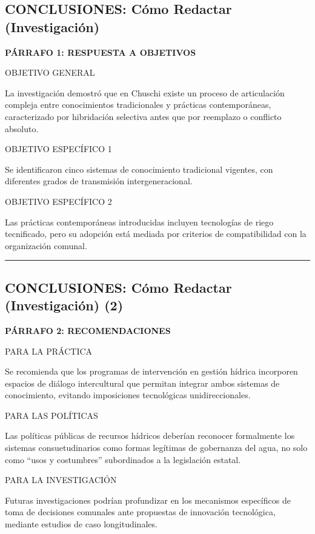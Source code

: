 \documentclass[
  11pt,
]{beaner}
\begin{document}
\subsection{CONCLUSIONES: Cómo Redactar
(Investigación)}\label{conclusiones-cuxf3mo-redactar-investigaciuxf3n}

\textbf{PÁRRAFO 1: RESPUESTA A OBJETIVOS}

{OBJETIVO GENERAL}

La investigación demostró que en Chuschi existe un proceso de
articulación compleja entre conocimientos tradicionales y prácticas
contemporáneas, caracterizado por hibridación selectiva antes que por
reemplazo o conflicto absoluto.

{OBJETIVO ESPECÍFICO 1}

Se identificaron cinco sistemas de conocimiento tradicional vigentes,
con diferentes grados de transmisión intergeneracional.

{OBJETIVO ESPECÍFICO 2}

Las prácticas contemporáneas introducidas incluyen tecnologías de riego
tecnificado, pero su adopción está mediada por criterios de
compatibilidad con la organización comunal.

\begin{center}\rule{0.5\linewidth}{0.5pt}\end{center}

\subsection{CONCLUSIONES: Cómo Redactar (Investigación)
(2)}\label{conclusiones-cuxf3mo-redactar-investigaciuxf3n-2}

\textbf{PÁRRAFO 2: RECOMENDACIONES}

{PARA LA PRÁCTICA}

Se recomienda que los programas de intervención en gestión hídrica
incorporen espacios de diálogo intercultural que permitan integrar ambos
sistemas de conocimiento, evitando imposiciones tecnológicas
unidireccionales.

{PARA LAS POLÍTICAS}

Las políticas públicas de recursos hídricos deberían reconocer
formalmente los sistemas consuetudinarios como formas legítimas de
gobernanza del agua, no solo como ``usos y costumbres'' subordinados a
la legislación estatal.

{PARA LA INVESTIGACIÓN}

Futuras investigaciones podrían profundizar en los mecanismos
específicos de toma de decisiones comunales ante propuestas de
innovación tecnológica, mediante estudios de caso longitudinales.
\end{document}
